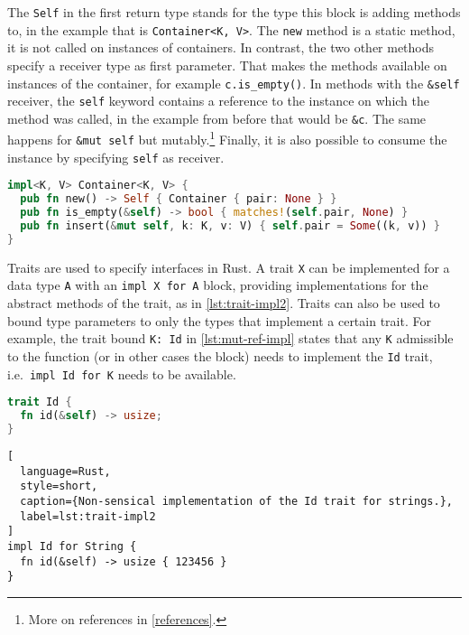 The \lstinline!Self! in the first return type stands for the type this block is
adding methods to, in the example that is \lstinline!Container<K, V>!. The
\lstinline!new! method is a static method, it is not called on instances of
containers. In contrast, the two other methods specify a receiver type as first
parameter. That makes the methods available on instances of the container, for
example \lstinline!c.is_empty()!. In methods with the \lstinline!&self!
receiver, the \lstinline!self! keyword contains a reference to the instance on
which the method was called, in the example from before that would be
\lstinline!&c!. The same happens for \lstinline!&mut self! but
mutably.\footnote{More on references in \autoref{references}.} Finally, it is
also possible to consume the instance by specifying \lstinline!self! as
receiver.

\begin{lstlisting}[language=Rust, caption={Methods for the running example}, label=lst:impl1]
impl<K, V> Container<K, V> {
  pub fn new() -> Self { Container { pair: None } }
  pub fn is_empty(&self) -> bool { matches!(self.pair, None) }
  pub fn insert(&mut self, k: K, v: V) { self.pair = Some((k, v)) }
}
\end{lstlisting}

Traits are used to specify interfaces in Rust. A trait \lstinline!X! can be
implemented for a data type \lstinline!A! with an \passthrough{\lstinline!impl X
for A!} block, providing implementations for the abstract methods of the trait,
as in \autoref{lst:trait-impl2}. Traits can also be used to bound type
parameters to only the types that implement a certain trait. For example, the
trait bound \lstinline!K: Id!  in \autoref{lst:mut-ref-impl} states that any
\lstinline!K! admissible to the function (or in other cases the block) needs to
implement the \lstinline!Id! trait, i.e.~\passthrough{\lstinline!impl Id for K!}
needs to be available.

\noindent\begin{minipage}[t]{.45\textwidth}
\begin{lstlisting}[language=Rust, style=short, caption={Rust trait with one method.}, label=lst:trait-impl1]
trait Id {
  fn id(&self) -> usize;
}
\end{lstlisting}
\end{minipage}\hfill
\begin{minipage}[t]{.45\textwidth}
\begin{lstlisting}[
  language=Rust,
  style=short,
  caption={Non-sensical implementation of the Id trait for strings.},
  label=lst:trait-impl2
]
impl Id for String {
  fn id(&self) -> usize { 123456 }
}
\end{lstlisting}
\end{minipage}


